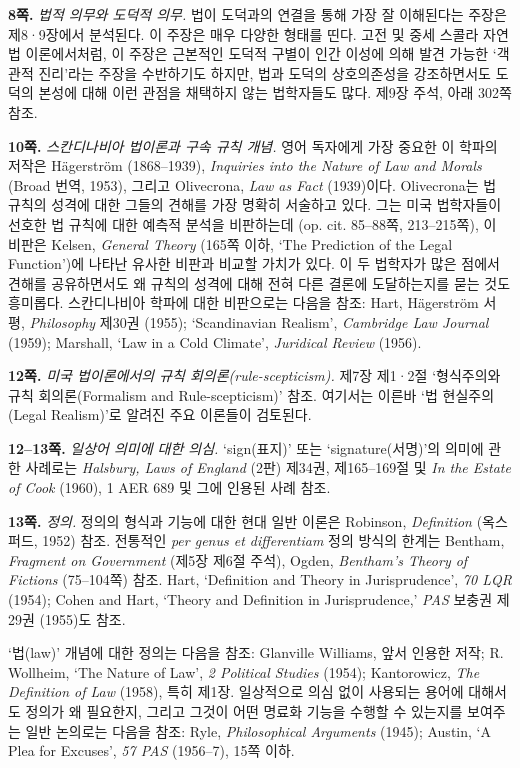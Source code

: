 \documentclass[12pt, oneside]{book}  %
\begin{document}
\textbf{8쪽.} \emph{법적 의무와 도덕적 의무.} 법이 도덕과의 연결을 통해
가장 잘 이해된다는 주장은 제8·9장에서 분석된다. 이 주장은 매우 다양한
형태를 띤다. 고전 및 중세 스콜라 자연법 이론에서처럼, 이 주장은 근본적인
도덕적 구별이 인간 이성에 의해 발견 가능한 `객관적 진리'라는 주장을
수반하기도 하지만, 법과 도덕의 상호의존성을 강조하면서도 도덕의 본성에
대해 이런 관점을 채택하지 않는 법학자들도 많다. 제9장 주석, 아래 302쪽
참조.

\textbf{10쪽.} \emph{스칸디나비아 법이론과 구속 규칙 개념.} 영어
독자에게 가장 중요한 이 학파의 저작은 Hägerström (1868--1939),
\emph{Inquiries into the Nature of Law and Morals} (Broad 번역, 1953),
그리고 Olivecrona, \emph{Law as Fact} (1939)이다. Olivecrona는 법 규칙의
성격에 대한 그들의 견해를 가장 명확히 서술하고 있다. 그는 미국
법학자들이 선호한 법 규칙에 대한 예측적 분석을 비판하는데 (op. cit.
85--88쪽, 213--215쪽), 이 비판은 Kelsen, \emph{General Theory} (165쪽
이하, `The Prediction of the Legal Function')에 나타난 유사한 비판과
비교할 가치가 있다. 이 두 법학자가 많은 점에서 견해를 공유하면서도 왜
규칙의 성격에 대해 전혀 다른 결론에 도달하는지를 묻는 것도 흥미롭다.
스칸디나비아 학파에 대한 비판으로는 다음을 참조: Hart, Hägerström 서평,
\emph{Philosophy} 제30권 (1955); `Scandinavian Realism', \emph{Cambridge
Law Journal} (1959); Marshall, `Law in a Cold Climate', \emph{Juridical
Review} (1956).

\textbf{12쪽.} \emph{미국 법이론에서의 규칙 회의론(rule-scepticism).}
제7장 제1·2절 `형식주의와 규칙 회의론(Formalism and Rule-scepticism)'
참조. 여기서는 이른바 `법 현실주의(Legal Realism)'로 알려진 주요
이론들이 검토된다.

\textbf{12--13쪽.} \emph{일상어 의미에 대한 의심.} `sign(표지)' 또는
`signature(서명)'의 의미에 관한 사례로는 \emph{Halsbury, Laws of
England} (2판) 제34권, 제165--169절 및 \emph{In the Estate of Cook}
(1960), 1 AER 689 및 그에 인용된 사례 참조.

\textbf{13쪽.} \emph{정의.} 정의의 형식과 기능에 대한 현대 일반 이론은
Robinson, \emph{Definition} (옥스퍼드, 1952) 참조. 전통적인 \emph{per
genus et differentiam} 정의 방식의 한계는 Bentham, \emph{Fragment on
Government} (제5장 제6절 주석), Ogden, \emph{Bentham's Theory of
Fictions} (75--104쪽) 참조. Hart, `Definition and Theory in
Jurisprudence', \emph{70 LQR} (1954); Cohen and Hart, `Theory and
Definition in Jurisprudence,' \emph{PAS} 보충권 제29권 (1955)도 참조.

`법(law)' 개념에 대한 정의는 다음을 참조: Glanville Williams, 앞서
인용한 저작; R. Wollheim, `The Nature of Law', \emph{2 Political
Studies} (1954); Kantorowicz, \emph{The Definition of Law} (1958), 특히
제1장. 일상적으로 의심 없이 사용되는 용어에 대해서도 정의가 왜 필요한지,
그리고 그것이 어떤 명료화 기능을 수행할 수 있는지를 보여주는 일반
논의로는 다음을 참조: Ryle, \emph{Philosophical Arguments} (1945);
Austin, `A Plea for Excuses', \emph{57 PAS} (1956--7), 15쪽 이하.
\end{document}
